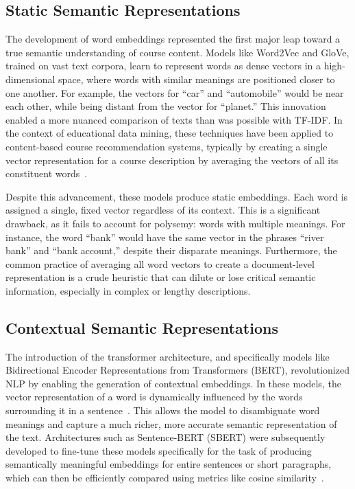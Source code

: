     \subsection{Static Semantic Representations}
    The development of word embeddings represented the first major leap toward a true semantic understanding of course content. Models like Word2Vec and GloVe, trained on vast text corpora, learn to represent words as dense vectors in a high-dimensional space, where words with similar meanings are positioned closer to one another. For example, the vectors for ``car'' and ``automobile'' would be near each other, while being distant from the vector for ``planet.'' This innovation enabled a more nuanced comparison of texts than was possible with TF-IDF. In the context of educational data mining, these techniques have been applied to content-based course recommendation systems, typically by creating a single vector representation for a course description by averaging the vectors of all its constituent words~\cite{pardos10.1145/3330430.3333622}.

    Despite this advancement, these models produce static embeddings. Each word is assigned a single, fixed vector regardless of its context. This is a significant drawback, as it fails to account for polysemy: words with multiple meanings. For instance, the word ``bank'' would have the same vector in the phrases ``river bank'' and ``bank account,'' despite their disparate meanings. Furthermore, the common practice of averaging all word vectors to create a document-level representation is a crude heuristic that can dilute or lose critical semantic information, especially in complex or lengthy descriptions.

    \subsection{Contextual Semantic Representations}
    The introduction of the transformer architecture, and specifically models like Bidirectional Encoder Representations from Transformers (BERT), revolutionized NLP by enabling the generation of contextual embeddings. In these models, the vector representation of a word is dynamically influenced by the words surrounding it in a sentence~\cite{devlin2019bertpretrainingdeepbidirectional}. This allows the model to disambiguate word meanings and capture a much richer, more accurate semantic representation of the text. Architectures such as Sentence-BERT (SBERT) were subsequently developed to fine-tune these models specifically for the task of producing semantically meaningful embeddings for entire sentences or short paragraphs, which can then be efficiently compared using metrics like cosine similarity~\cite{reimers2019sentencebertsentenceembeddingsusing}.

